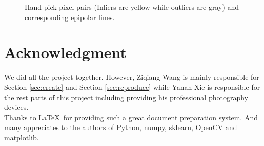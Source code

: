 \documentclass[10pt,twocolumn,letterpaper]{article}
\begin{document}
\begin{figure}[t]
{}

\caption{Hand-pick pixel pairs (Inliers are yellow while outliers are gray) and corresponding epipolar lines.}
\label{fig:epipolar}
\end{figure}

\section{Acknowledgment}
We did all the project together. However, Ziqiang Wang is mainly responsible for
Section \ref{sec:create} and Section \ref{sec:reproduce} while Yanan Xie is responsible for the rest parts of this project including providing his professional photography devices.\\

Thanks to \LaTeX\ for providing such a great document preparation system. And many appreciates to the authors of Python, numpy, sklearn, OpenCV and matplotlib.\\
\end{document}
